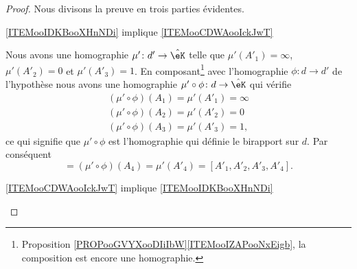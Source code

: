 \begin{proof}
    Nous divisons la preuve en trois parties évidentes.
    \begin{subproof}
        \item[\ref{ITEMooIDKBooXHnNDi} implique \ref{ITEMooCDWAooIckJwT}]
        
            Nous avons une homographie \( \mu'\colon d'\to \hat\eK\) telle que \( \mu'(A'_1)=\infty\), \( \mu'(A'_2)=0\) et \( \mu'(A'_3)=1\). En composant\footnote{Proposition \ref{PROPooGVYXooDIiIbW}\ref{ITEMooIZAPooNxEigb}, la composition est encore une homographie.} avec l'homographie \( \phi\colon d\to d'\) de l'hypothèse nous avons une homographie \( \mu'\circ \phi\colon d\to \hat\eK\) qui vérifie
            \begin{subequations}
                \begin{align}
                    (\mu'\circ\phi)(A_1)=\mu'(A'_1)=\infty\\
                    (\mu'\circ\phi)(A_2)=\mu'(A'_2)=0\\
                    (\mu'\circ\phi)(A_3)=\mu'(A'_3)=1,
                \end{align}
            \end{subequations}
            ce qui signifie que \( \mu'\circ\phi\) est l'homographie qui définie le birapport sur \( d\). Par conséquent
            \begin{equation}
                    [A_1,A_2,A_3,A_4]=(\mu'\circ \phi)(A_4)=\mu'(A'_4)=[A'_1,A'_2,A'_3,A'_4].
            \end{equation}
        \item[\ref{ITEMooCDWAooIckJwT} implique \ref{ITEMooIDKBooXHnNDi}]


\end{subproof}
\end{proof}

